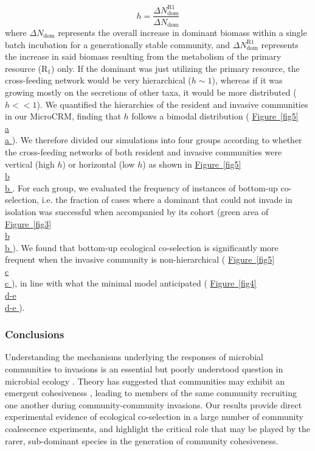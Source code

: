 \documentclass[a4paper,10pt]{article}
\newcommand{\figref}[2][]{%
  \hyperref[{#2}]{%
    Figure~\ref*{#2}%
    \ifx\\#1\\%
    \else
      #1%
    \fi
  }%
}
\begin{document}
\begin{equation}
h = \frac{\Delta N_{\mathrm{dom}}^{\mathrm{R1}}}{\Delta N_{\mathrm{dom}}}
\label{eq:h}
\end{equation}
%
where $\Delta N_{\mathrm{dom}}$ represents the overall increase in dominant biomass
within a single batch incubation for a generationally stable community,
and $\Delta N_{\mathrm{dom}}^{\mathrm{R1}}$
represents the increase in said biomass resulting from the metabolism of the primary resource
($\mathrm{R}_1$) only.
If the dominant was just utilizing the primary resource, the cross-feeding network would be very
hierarchical ($h \sim 1$),
whereas if it was growing mostly on the secretions of other taxa,
it would be more distributed ($h << 1$).
We quantified the hierarchies of the resident and invasive communities in our MicroCRM,
finding that $h$ follows a bimodal distribution (\figref[a]{fig5}).
We therefore divided our simulations into four groups according to
whether the cross-feeding networks of both resident and invasive communities were
vertical (high $h$) or horizontal (low $h$) as shown in
\figref[b]{fig5}.
For each group, we evaluated the frequency of instances of bottom-up co-selection,
i.e. the fraction of cases where a dominant that could not invade in isolation
was successful when accompanied by its cohort
(green area of \figref[b]{fig3}).
We found that bottom-up ecological co-selection
is significantly more frequent when the invasive community is
non-hierarchical (\figref[c]{fig5}),
in line with what the minimal model anticipated
(\figref[d-e]{fig4}).

\subsubsection*{Conclusions}

Understanding the mechanisms underlying the responses of microbial communities to invasions is
an essential but poorly understood question in microbial ecology \cite{Rillig2015}.
Theory has suggested that communities may exhibit an emergent cohesiveness
\cite{Gilpin1994,Livingston2013,Tikhonov2016,Tikhonov2017},
leading to members of the same community recruiting one another during
community-community invasions.
Our results provide direct experimental evidence of ecological co-selection in a large number
of community coalescence experiments,
and highlight the critical role that may be played by the rarer, sub-dominant species in the generation
of community cohesiveness.
\end{document}
